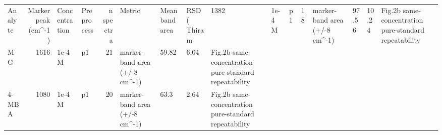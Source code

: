 \begin{tabular}{lrllrllll}
\toprule
Analyte & Marker peak (cm^-1) & Concentration & Preprocess & n spectra & Metric & Mean band area & RSD (%
\midrule
Thiram & 1382 & 1e-4 M & p1 & 18 & marker-band area (+/-8 cm^-1) & 97.56 & 10.24 & Fig.2b same-concentration pure-standard repeatability \\
MG & 1616 & 1e-4 M & p1 & 21 & marker-band area (+/-8 cm^-1) & 59.82 & 6.04 & Fig.2b same-concentration pure-standard repeatability \\
4-MBA & 1080 & 1e-4 M & p1 & 20 & marker-band area (+/-8 cm^-1) & 63.3 & 2.64 & Fig.2b same-concentration pure-standard repeatability \\
\bottomrule
\end{tabular}
